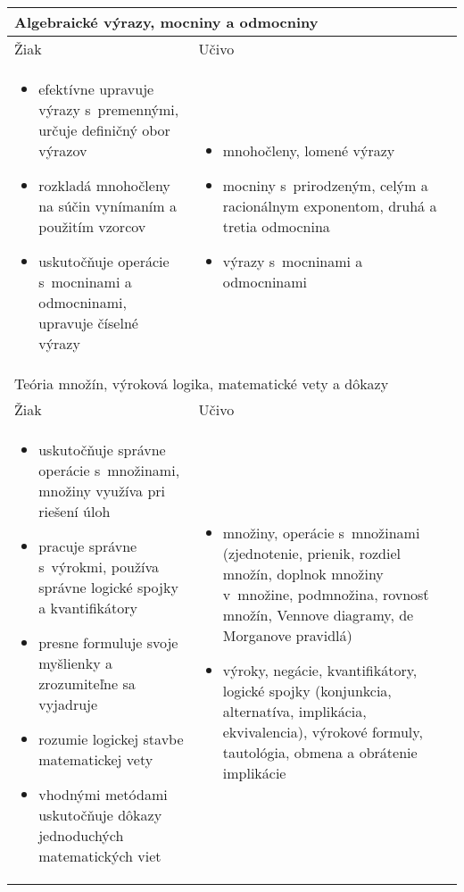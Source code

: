\begin{longtable}{ p{} p{}} \toprule
\multicolumn{2}{p{\textwidth}}{Algebraické výrazy, mocniny a odmocniny} \\ \midrule
  Žiak & Učivo \\ \vspace{-10pt}
  \begin{itemize}
    \item efektívne upravuje výrazy s~premennými, určuje definičný obor výrazov
    \item rozkladá mnohočleny na súčin vynímaním a použitím vzorcov
    \item uskutočňuje operácie s~mocninami a odmocninami, upravuje číselné výrazy
  \end{itemize} &  \vspace{-10pt}
  \begin{itemize}
    \item mnohočleny, lomené výrazy
    \item mocniny s~prirodzeným, celým a racionálnym exponentom, druhá a tretia odmocnina
    \item výrazy s~mocninami a odmocninami
  \end{itemize} \\ \midrule
  \multicolumn{2}{p{\textwidth}}{Teória množín, výroková logika, matematické vety a dôkazy} \\ \midrule
  Žiak & Učivo \\ \vspace{-10pt}
  \begin{itemize}
    \item uskutočňuje správne operácie s~množinami, množiny využíva pri riešení úloh
    \item pracuje správne s~výrokmi, používa správne logické spojky a kvantifikátory
    \item presne formuluje svoje myšlienky a zrozumiteľne sa vyjadruje
    \item rozumie logickej stavbe matematickej vety
    \item vhodnými metódami uskutočňuje dôkazy jednoduchých matematických viet
  \end{itemize} & \vspace{-10pt}
  \begin{itemize}
    \item množiny, operácie s~množinami (zjednotenie, prienik, rozdiel množín, doplnok množiny v~množine, podmnožina, rovnosť množín, Vennove diagramy, de Morganove pravidlá)
    \item výroky, negácie, kvantifikátory, logické spojky (konjunkcia, alternatíva, implikácia, ekvivalencia), výrokové formuly, tautológia, obmena a obrátenie implikácie

\end{itemize}
\end{longtable}
